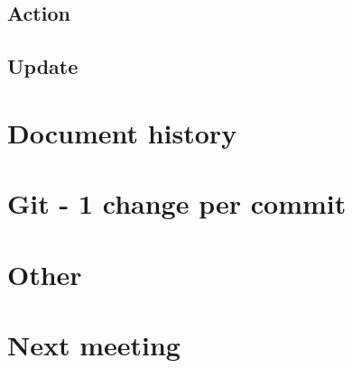 \documentclass{article}
\begin{document}
\begin{flushleft}
  \subsection{Action}
  \subsection{Update}
\section{Document history}
\section{Git - 1 change per commit}
\section{Other}
\section{Next meeting}



\end{flushleft}
\end{document}
